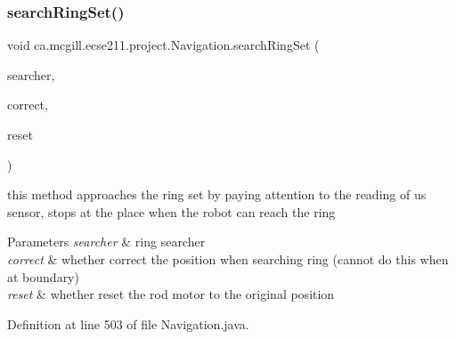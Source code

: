 \subsubsection{\texorpdfstring{search\+Ring\+Set()}{searchRingSet()}}
{\footnotesize\ttfamily void ca.\+mcgill.\+ecse211.\+project.\+Navigation.\+search\+Ring\+Set (\begin{DoxyParamCaption}\item[{\hyperlink{classca_1_1mcgill_1_1ecse211_1_1project_1_1_ring_searcher}{Ring\+Searcher}}]{searcher,  }\item[{boolean}]{correct,  }\item[{boolean}]{reset }\end{DoxyParamCaption})}


\begin{DoxyItemize}
\item this method approaches the ring set by paying attention to the reading of us sensor, stops at the place when the robot can reach the ring 
\begin{DoxyParams}{Parameters}
{\em searcher} & ring searcher \\
\hline
{\em correct} & whether correct the position when searching ring (cannot do this when at boundary) \\
\hline
{\em reset} & whether reset the rod motor to the original position \\
\hline
\end{DoxyParams}

\end{DoxyItemize}

Definition at line 503 of file Navigation.\+java.



